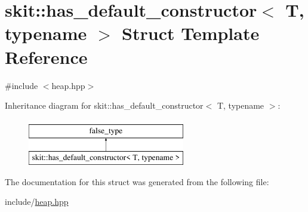 \hypertarget{structskit_1_1has__default__constructor}{}\section{skit\+:\+:has\+\_\+default\+\_\+constructor$<$ T, typename $>$ Struct Template Reference}
\label{structskit_1_1has__default__constructor}


{\ttfamily \#include $<$heap.\+hpp$>$}

Inheritance diagram for skit\+:\+:has\+\_\+default\+\_\+constructor$<$ T, typename $>$\+:\begin{figure}[H]
\begin{center}
\leavevmode
\includegraphics[height=2.000000cm]{structskit_1_1has__default__constructor}
\end{center}
\end{figure}


The documentation for this struct was generated from the following file\+:\begin{DoxyCompactItemize}
\item 
include/\hyperlink{heap_8hpp}{heap.\+hpp}\end{DoxyCompactItemize}
